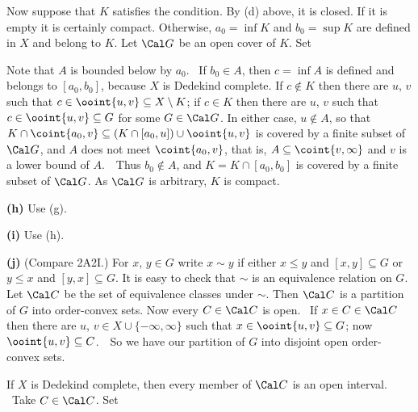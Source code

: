 {\medskip

 Now suppose that $K$ satisfies the condition.   By (d)
above, it
is closed.   If it is empty it is certainly compact.   Otherwise,
$a_0=\inf K$ and $b_0=\sup K$ are defined in $X$ and belong to $K$.
Let $\Cal G$ be an open cover of $K$.   Set


\noindent Note that $A$ is bounded below by $a_0$.   \Quer\ If
$b_0\in A$, then $c=\inf A$ is defined and belongs to $[a_0,b_0]$,
because $X$ is Dedekind complete.   If $c\notin K$ then
there are $u$, $v$ such that $c\in\ooint{u,v}\subseteq X\setminus K$;
if $c\in K$ then there are $u$, $v$ such that
$c\in\ooint{u,v}\subseteq G$ for some $G\in\Cal G$.   In either case,
$u\notin A$, so that
$K\cap\coint{a_0,v}\subseteq(K\cap[a_0,u])\cup\ooint{u,v}$
is covered by a finite subset of $\Cal G$, and $A$ does not meet
$\coint{a_0,v}$, that is, $A\subseteq\coint{v,\infty}$ and $v$ is a
lower bound of $A$.\ \BanG\   Thus $b_0\notin A$, and $K=K\cap[a_0,b_0]$
is covered by a finite subset of $\Cal G$.   As $\Cal G$ is arbitrary,
$K$ is compact.

\medskip

{\bf (h)} Use (g).

\medskip

{\bf (i)} Use (h).

\medskip

{\bf (j)} (Compare 2A2I.)
For $x$, $y\in G$ write $x\sim y$ if either $x\le y$ and
$[x,y]\subseteq G$ or $y\le x$ and $[y,x]\subseteq G$.   It is easy to
check that $\sim$ is an equivalence relation on $G$.   Let $\Cal C$ be
the set of equivalence classes under $\sim$.   Then $\Cal C$ is a
partition of $G$ into order-convex sets.
Now every $C\in\Cal C$ is open.   \Prf\ If $x\in C\in\Cal C$ then
there are $u$, $v\in X\cup\{-\infty,\infty\}$ such that
$x\in\ooint{u,v}\subseteq G$;  now $\ooint{u,v}\subseteq C$.\ \QeD\   So we
have our partition of $G$ into disjoint open order-convex sets.

If $X$ is Dedekind complete, then every member of $\Cal C$ is an open
interval.   \Prf\ Take $C\in\Cal C$.   Set




}
